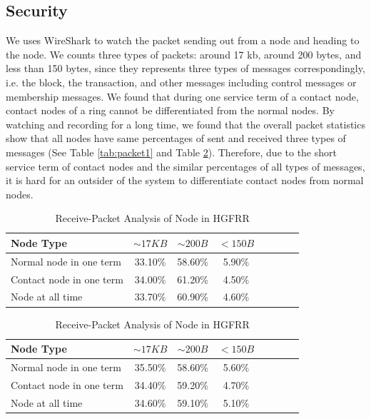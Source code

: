 \subsection{Security}

We uses WireShark \cite{chappell2010wireshark} to watch the packet sending out from a node and heading to the node. We counts three types of packets: around 17 kb, around 200 bytes, and less than 150 bytes, since they represents three types of messages correspondingly, i.e. the block, the transaction, and other messages including control messages or membership messages. We found that during one service term of a contact node, contact nodes of a ring cannot be differentiated from the normal nodes. By watching and recording for a long time, we found that the overall packet statistics show that all nodes have same percentages of sent and received three types of messages (See Table \ref{tab:packet1} and Table \ref{tab:packet2}). Therefore, due to the short service term of contact nodes and the similar percentages of all types of messages, it is hard for an outsider of the system to differentiate contact nodes from normal nodes.

\begin{table}
	\begin{tabular}{l*{6}{c}r}
		Node Type & $\sim17 KB$ & $\sim200 B$ & $<150 B$ \\
		\hline		
		Normal node in one term & 33.10\%	& 58.60\% & 5.90\% \\
		Contact node in one term & 34.00\%	& 61.20\% &4.50\%  \\
		Node at all time  & 33.70\%	& 60.90\% &4.60\%  \\
	\end{tabular}
	\caption{Send-Packet Analysis of Node in HGFRR}
	\label{tab:packet1}
	\vspace{2mm}
	\begin{tabular}{l*{6}{c}r}
		Node Type & $\sim17 KB$ & $\sim200 B$ & $<150 B$ \\
		\hline		
		Normal node in one term & 35.50\% & 58.60\% & 5.60\% \\
		Contact node in one term & 34.40\% & 59.20\% & 4.70\%  \\
		Node at all time  & 34.60\% & 59.10\% & 5.10\%  \\
	\end{tabular}
	\caption{Receive-Packet Analysis of Node in HGFRR}
	\label{tab:packet2}
\end{table}